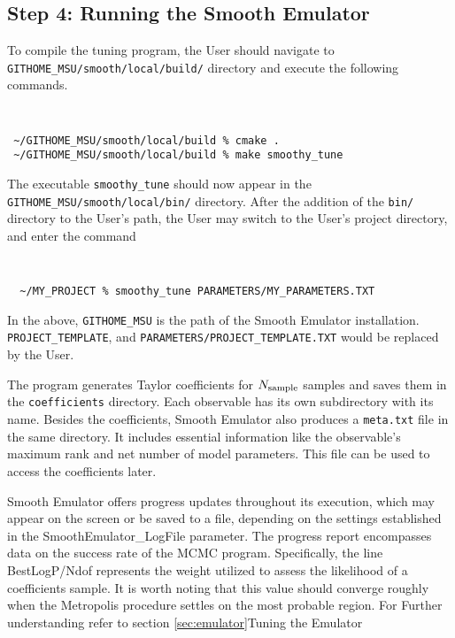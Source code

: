 \documentclass[main.tex]{subfiles}
\begin{document}
\subsection{Step 4: Running the Smooth Emulator}
To compile the tuning program, the User should navigate to {\tt GITHOME\_MSU/smooth/local/build/} directory and execute the following commands.
{\tt
\begin{verbatim}
 ~/GITHOME_MSU/smooth/local/build % cmake .
 ~/GITHOME_MSU/smooth/local/build % make smoothy_tune
\end{verbatim}
}
The executable {\tt smoothy\_tune} should now appear in the {\tt GITHOME\_MSU/smooth/local/bin/} directory. After the addition of the {\tt bin/} directory to the User's path, the User may switch to the User's project directory, and enter the command
{\tt
\begin{verbatim}
  ~/MY_PROJECT % smoothy_tune PARAMETERS/MY_PARAMETERS.TXT
\end{verbatim}
}
In the above, {\tt GITHOME\_MSU} is the path of the Smooth Emulator installation. {\tt PROJECT\_TEMPLATE}, and {\tt PARAMETERS/PROJECT\_TEMPLATE.TXT} would be replaced by the User.

The program generates Taylor coefficients for $N_{\rm sample}$ samples and saves them in the {\tt coefficients} directory. Each observable has its own subdirectory with its name. Besides the coefficients, Smooth Emulator also produces a {\tt meta.txt} file in the same directory. It includes essential information like the observable's maximum rank and net number of model parameters. This file can be used to access the coefficients later.

Smooth Emulator offers progress updates throughout its execution, which may appear on the screen or be saved to a file, depending on the settings established in the SmoothEmulator\_LogFile parameter. The progress report encompasses data on the success rate of the MCMC program. Specifically, the line BestLogP/Ndof represents the weight utilized to assess the likelihood of a coefficients sample. It is worth noting that this value should converge roughly when the Metropolis procedure settles on the most probable region. For Further understanding refer to section \ref{sec:emulator}{Tuning the Emulator}
\end{document}
